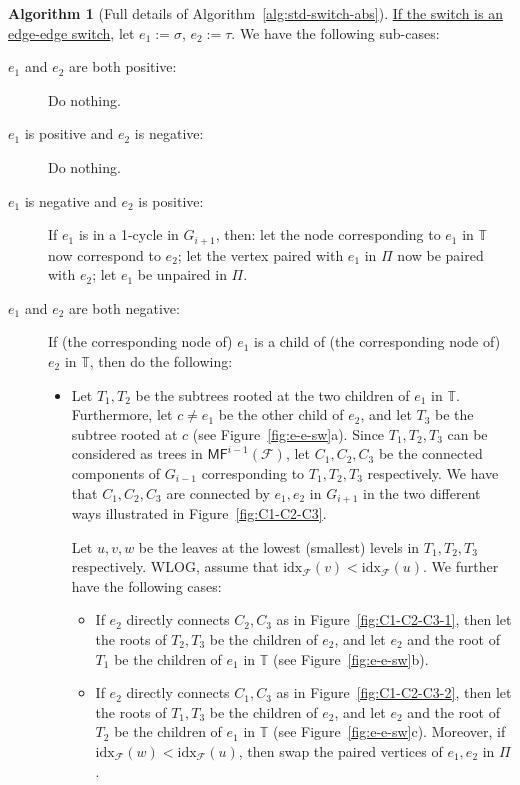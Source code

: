 \documentclass[letterpaper,11pt]{article}
\theoremstyle{mythmstyle}
\theoremstyle{mydefstyle}
\newtheorem{algr}[algorithm]{Algorithm}
\theoremstyle{plain}
\theoremstyle{definition}
\newtheorem{algr}{Algorithm}
\newcommand{\<}[1]{\langle #1\rangle}
\newcommand{\MF}{\mathsf{MF}}
\newcommand{\idx}{\mathrm{idx}}
\newcommand{\Fcal}{\mathcal{F}}
\newcommand{\sG}{\sigma}
\newcommand{\tG}{\tau}
\newcommand{\Fpo}{\mathbb{T}}
\theoremstyle{definition}
\begin{document}
\begin{algr}[Full details of Algorithm~\ref{alg:std-switch-abs}]
\noindent \underline{If the switch is an edge-edge switch}, let 
    $e_1:=\sG$, $e_2:=\tG$.
  We have the following sub-cases:
   \begin{description}
       \item[$e_1$ and $e_2$ are both  positive:]
       Do nothing.
       \item[$e_1$ is positive and $e_2$ is negative:]
       Do nothing.
       \item[$e_1$ is negative and $e_2$ is positive:]
       If $e_1$ is in a 1-cycle in $G_{i+1}$,
       then: let the node corresponding to $e_1$ in $\Fpo$
       now correspond to $e_2$;
       let the vertex paired with $e_1$ in $\Pi$ now be paired with $e_2$;
       let $e_1$ be unpaired in $\Pi$. 
       \item[$e_1$ and $e_2$ are both  negative:]
    If (the corresponding node of) $e_1$ is a child of (the corresponding node of) $e_2$
           in $\Fpo$, then do the following:
       \begin{itemize}
           \item
           Let $T_1,T_2$ be the subtrees rooted at the two children of $e_1$ in $\Fpo$.
           Furthermore, let $c\neq e_1$ be the other child of $e_2$,
           and let $T_3$ be the subtree rooted at $c$ (see Figure~\ref{fig:e-e-sw}a). 
           Since $T_1,T_2,T_3$ can be considered as trees in $\MF^{i-1}(\Fcal)$,
           let $C_1,C_2,C_3$ be the connected components of $G_{i-1}$
           corresponding to $T_1,T_2,T_3$ respectively.
           We have that $C_1,C_2,C_3$ are connected by $e_1,e_2$ in $G_{i+1}$
           in the two different ways illustrated in Figure~\ref{fig:C1-C2-C3}.
           
           Let $u,v,w$ be the leaves at the lowest (smallest) levels in $T_1,T_2,T_3$ respectively. 
           WLOG, assume that $\idx_\Fcal(v)<\idx_\Fcal(u)$.
           We further have the following cases:
           \begin{itemize}
               \item
               If $e_2$ directly connects $C_2,C_3$ as in Figure~\ref{fig:C1-C2-C3-1},
               then let the roots of $T_2,T_3$ be the children of $e_2$,
               and let $e_2$ and the root of $T_1$ be the children of $e_1$ in $\Fpo$ (see Figure~\ref{fig:e-e-sw}b).
               \item
               If $e_2$ directly connects $C_1,C_3$ as in Figure~\ref{fig:C1-C2-C3-2},
               then let the roots of $T_1,T_3$ be the children of $e_2$,
               and let $e_2$ and the root of $T_2$ be the children of $e_1$ in $\Fpo$ (see Figure~\ref{fig:e-e-sw}c).
               Moreover,
               if 
               $\idx_\Fcal(w)<\idx_\Fcal(u)$, then  swap the paired vertices of $e_1,e_2$
               in $\Pi$.
           \end{itemize}
       \end{itemize}
   \end{description}
    


\end{algr}
\end{document}
